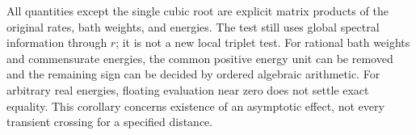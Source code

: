 All quantities except the single cubic root are explicit matrix products
of the original rates, bath weights, and energies. The test still uses
global spectral information through $r$; it is not a new local triplet
test. For rational bath weights and commensurate energies, the common
positive energy unit can be removed and the remaining sign can be
decided by ordered algebraic arithmetic. For arbitrary real energies,
floating evaluation near zero does not settle exact equality. This
corollary concerns existence of an asymptotic effect, not every transient
crossing for a specified distance.
